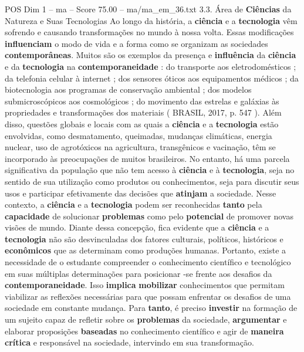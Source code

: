 \begin{textsample}{POS Dim 1 – ma – Score 75.00 – ma/ma\_em\_36.txt}  \label{ex:f1_pos_062}
3.3.
Área de \textbf{Ciências} da Natureza e Suas Tecnologias Ao longo da história, a \textbf{ciência} e a \textbf{tecnologia} vêm sofrendo e causando transformações no mundo à nossa volta.
Essas modificações \textbf{influenciam} o modo de vida e a forma como se organizam as sociedades \textbf{contemporâneas}.
Muitos são os exemplos da presença e \textbf{influência} da \textbf{ciência} e da \textbf{tecnologia} na \textbf{contemporaneidade} : do transporte aos eletrodomésticos ; da telefonia celular à internet ; dos sensores óticos aos equipamentos médicos ; da biotecnologia aos programas de conservação ambiental ; dos modelos submicroscópicos aos cosmológicos ; do movimento das estrelas e galáxias às propriedades e transformações dos materiais ( BRASIL, 2017, p. 547 ).
Além disso, questões globais e locais com as quais a \textbf{ciência} e a \textbf{tecnologia} estão envolvidas, como desmatamento, queimadas, mudanças climáticas, energia nuclear, uso de agrotóxicos na agricultura, transgênicos e vacinação, têm se incorporado às preocupações de muitos brasileiros.
No entanto, há uma parcela significativa da população que não tem acesso à \textbf{ciência} e à \textbf{tecnologia}, seja no sentido de sua utilização como produtos ou conhecimentos, seja para discutir seus usos e participar efetivamente das decisões que \textbf{atinjam} a sociedade.
Nesse contexto, a \textbf{ciência} e a \textbf{tecnologia} podem ser reconhecidas \textbf{tanto} pela \textbf{capacidade} de solucionar \textbf{problemas} como pelo \textbf{potencial} de promover novas visões de mundo.
Diante dessa concepção, fica evidente que a \textbf{ciência} e a \textbf{tecnologia} não são desvinculadas dos fatores culturais, políticos, históricos e \textbf{econômicos} que as determinam como produções humanas.
Portanto, existe a necessidade de o estudante compreender o conhecimento científico e tecnológico em suas múltiplas determinações para posicionar -se frente aos desafios da \textbf{contemporaneidade}.
Isso \textbf{implica} \textbf{mobilizar} conhecimentos que permitam viabilizar as reflexões necessárias para que possam enfrentar os desafios de uma sociedade em constante mudança.
Para \textbf{tanto}, é preciso \textbf{investir} na formação de um sujeito capaz de refletir sobre os \textbf{problemas} da sociedade, \textbf{argumentar} e elaborar proposições \textbf{baseadas} no conhecimento científico e agir de \textbf{maneira} \textbf{crítica} e responsável na sociedade, intervindo em sua transformação.

\end{textsample}
